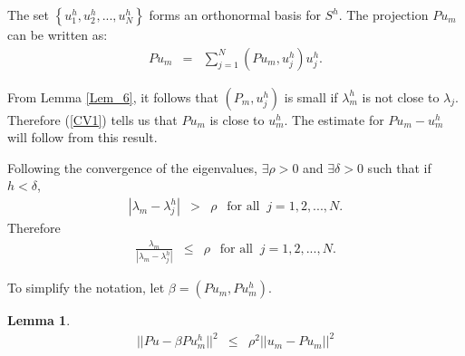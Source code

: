 \documentclass[../../main.tex]{subfiles}
\begin{document}
The set $\left\{u_{1}^{h},u_{2}^{h},...,u_{N}^{h}\right\}$ forms an orthonormal basis for $S^{h}$. The projection $Pu_{m}$ can be written as:
\begin{eqnarray}
	Pu_{m} &=& \sum_{j=1}^{N} ( P u_{m} ,u_{j}^{h}) u_{j}^{h}. \label{CV1}
\end{eqnarray}


From Lemma \ref{Lem_6}, it follows that $( P_{m},u_{j}^{h} )$ is small if $\lambda_{m}^{h}$ is not close to $\lambda_{j}$. Therefore (\ref{CV1}) tells us that $Pu_{m}$ is close to $u_{m}^{h}$. The estimate for $Pu_{m} - u_{m}^{h}$ will follow from this result.


Following the convergence of the eigenvalues, $\exists \rho > 0$ and $\exists \delta > 0$ such that if $h<\delta$,
\begin{eqnarray}
|\lambda_{m} - \lambda_{j}^{h}| &>& \rho \ \ \textrm{ for all } \ j = 1,2,...,N.
\end{eqnarray}
Therefore
\begin{eqnarray}
\frac{\lambda_{m}}{|\lambda_{m} - \lambda_{j}^{h}|} &\leq & \rho \ \ \textrm{ for all } \ j = 1,2,...,N.
\end{eqnarray}

To simplify the notation, let $\beta = (Pu_m,Pu_m^h)$.

\newtheorem{Lem_7}[Lem_1]{Lemma} \label{Lem_7}
\begin{Lem_7}
	\begin{eqnarray*}
		||Pu - \beta Pu^h_m||^{2} &\leq & {\rho}^{2} ||u_{m} - Pu_{m}||^{2}
	\end{eqnarray*}
\end{Lem_7}
\begin{comment}
\begin{proof}

Using Lemma \ref{Lem_6}:
\begin{eqnarray*}
||Pu - \beta u_{m}^{h}||^{2} &=& \sum_{j\neq m} \left(\frac{\lambda_{m}}{|\lambda_{m} - \lambda_{j}^{h}|}\right)^{2} ( u_{m} - Pu_{m} ,u_{j}^{h})^{2},\\
				&\leq & \rho^{2} \sum_{j\neq m} ( u_{m} - Pu_{m} ,u_{j}^{h})^{2}, \\
				&\leq & \rho^{2} \sum_{j=1}^{N} ( u_{m} - Pu_{m} ,u_{j}^{h})^{2}, \\
				& = & \rho^{2} ||u_m - Pu_m||^{2}.\\
\end{eqnarray*}
\end{proof}
\end{comment}
\end{document}
